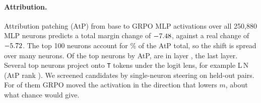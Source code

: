 \documentclass[11pt]{article}
\begin{document}
\paragraph{Attribution.} Attribution patching (AtP) from base to GRPO MLP
activations over all 250{,}880 MLP neurons predicts a total margin change of
$-7.48$, against a real change of $-5.72$. The top 100 neurons
account for \EfourTopShare\% of the AtP total, so the shift is spread over many
neurons. Of the top \EfourTopN{} neurons by AtP, \EfourTopLayerCount{} are in
layer \EfourTopLayer{}, the last layer. Several top neurons project onto
\texttt{T} tokens under the logit lens, for example
L\EfourScrALayer{}\,N\EfourScrANeuron{} (AtP rank \EfourScrAAtpRank).
We screened \EfourScreened{} candidates by single-neuron steering on
\EfourScreenPairs{} held-out pairs. For \EfourAgree{} of them GRPO moved the
activation in the direction that lowers $m$, about what chance would give.
\end{document}
